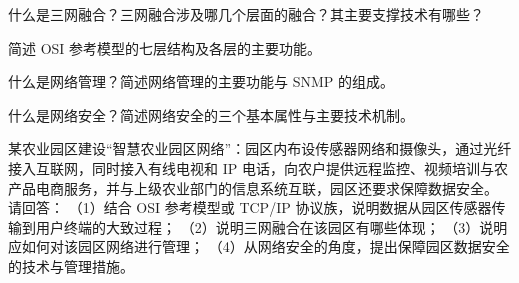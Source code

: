 \documentclass[a4paper,11pt]{article}
\begin{document}
\newpage
{}
\q 什么是三网融合？三网融合涉及哪几个层面的融合？其主要支撑技术有哪些？\anslines{2.4cm}

\q 简述 OSI 参考模型的七层结构及各层的主要功能。\anslines{2.4cm}

\q 什么是网络管理？简述网络管理的主要功能与 SNMP 的组成。\anslines{2.4cm}

\q 什么是网络安全？简述网络安全的三个基本属性与主要技术机制。\anslines{2.4cm}

\newpage
{}
\q 某农业园区建设“智慧农业园区网络”：园区内布设传感器网络和摄像头，通过光纤接入互联网，同时接入有线电视和 IP 电话，向农户提供远程监控、视频培训与农产品电商服务，并与上级农业部门的信息系统互联，园区还要求保障数据安全。
请回答：
（1）结合 OSI 参考模型或 TCP/IP 协议族，说明数据从园区传感器传输到用户终端的大致过程；
（2）说明三网融合在该园区有哪些体现；
（3）说明应如何对该园区网络进行管理；
（4）从网络安全的角度，提出保障园区数据安全的技术与管理措施。\anslines{5cm}
\end{document}
